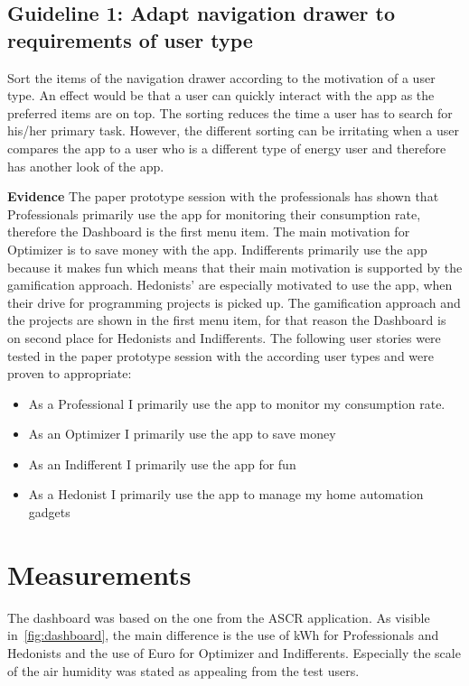 \subsection*{Guideline 1: Adapt navigation drawer to requirements of user type}

 Sort the items of the navigation drawer according to the motivation of a user type. An effect would be that a user can quickly interact with the app as the preferred items are on top. The sorting reduces the time a user has to search for his/her primary task. However, the different sorting can be irritating when a user compares the app to a user who is a different type of energy user and therefore has another look of the app.
 
\textbf{Evidence} \quad The paper prototype session with the professionals has shown that Professionals primarily use the app for monitoring their consumption rate, therefore the Dashboard is the first menu item. The main motivation for Optimizer is to save money with the app. Indifferents primarily use the app because it makes fun which means that their main motivation is supported by the gamification approach. Hedonists' are especially motivated to use the app, when their drive for programming projects is picked up. The gamification approach and the projects are shown in the first menu item, for that reason the Dashboard is on second place for Hedonists and Indifferents. The following user stories were tested in the paper prototype session with the according user types and were proven to appropriate:
\begin{itemize}
	\item As a Professional I primarily use the app to monitor my consumption rate.
	\item As an Optimizer I primarily use the app to save money
	\item As an Indifferent I primarily use the app for fun
	\item As a Hedonist I primarily use the app to manage my home automation gadgets	
\end{itemize}


\section{Measurements}

The dashboard was based on the one from the ASCR application. As visible in~\ref{fig:dashboard}, the main difference is the use of kWh for Professionals and Hedonists and the use of Euro for Optimizer and Indifferents. Especially the scale of the air humidity was stated as appealing from the test users.

